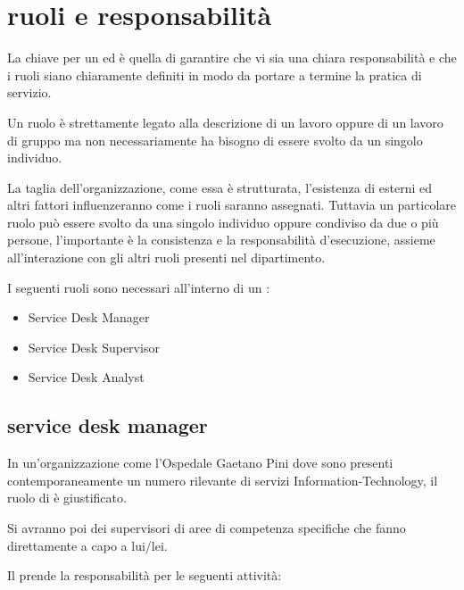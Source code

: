 %
%
\section[Ruoli e responsabilità]{ruoli e responsabilità}
\label{sd-roles-responsabilities}
La chiave per un   ed  è quella di garantire che vi sia una chiara responsabilità e che i ruoli siano chiaramente definiti in modo da portare a termine la pratica di servizio. 

Un ruolo è strettamente legato alla descrizione di un lavoro oppure di un lavoro di gruppo ma non necessariamente ha bisogno di essere svolto da un singolo individuo.

La taglia dell'organizzazione, come essa è strutturata, l'esistenza di  esterni ed altri fattori influenzeranno come i ruoli saranno assegnati. Tuttavia un particolare ruolo può essere svolto da una singolo individuo oppure condiviso da due o più persone, l'importante è la consistenza e la responsabilità d'esecuzione, assieme all'interazione con gli altri ruoli presenti nel dipartimento.

I seguenti ruoli sono necessari all'interno di un :

\begin{itemize}
\item{Service Desk Manager}
\item{Service Desk Supervisor}
\item{Service Desk Analyst}
\end{itemize}

\subsection[Service Desk Manager]{service desk manager}
\label{sd-sd-manger}
In un'organizzazione come l'Ospedale Gaetano Pini dove sono presenti contemporaneamente un numero rilevante di servizi \acs{Information-Technology}, il ruolo di  è giustificato.

Si avranno poi dei supervisori di aree di competenza specifiche che fanno direttamente a capo a lui/lei.

Il  prende la responsabilità per le seguenti attività:

